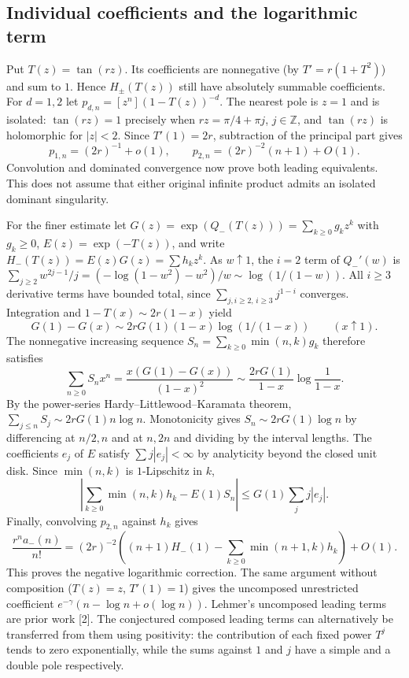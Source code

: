\documentclass[11pt,a4paper]{article}
\numberwithin{equation}{section}
\theoremstyle{definition}
\theoremstyle{remark}
\begin{document}
\subsection*{Individual coefficients and the logarithmic term}
Put $T(z)=\tan(rz)$. Its coefficients are nonnegative (by $T'=r(1+T^2)$) and sum to $1$. Hence $H_\pm(T(z))$ still have absolutely summable coefficients. For $d=1,2$ let $p_{d,n}=[z^n](1-T(z))^{-d}$. The nearest pole is $z=1$ and is isolated: $\tan(rz)=1$ precisely when $rz=\pi/4+\pi j$, $j\in\mathbb Z$, and $\tan(rz)$ is holomorphic for $|z|<2$. Since $T'(1)=2r$, subtraction of the principal part gives
\[
 p_{1,n}=(2r)^{-1}+o(1),\qquad
 p_{2,n}=(2r)^{-2}(n+1)+O(1).
\]
Convolution and dominated convergence now prove both leading equivalents. This does not assume that either original infinite product admits an isolated dominant singularity.

For the finer estimate let $G(z)=\exp(Q_-(T(z)))=\sum_{k\ge0}g_kz^k$ with $g_k\ge0$, $E(z)=\exp(-T(z))$, and write $H_-(T(z))=E(z)G(z)=\sum h_kz^k$. As $w\uparrow1$, the $i=2$ term of $Q_-'(w)$ is
$\sum_{j\ge2}w^{2j-1}/j=(-\log(1-w^2)-w^2)/w\sim\log(1/(1-w))$.
All $i\ge3$ derivative terms have bounded total, since $\sum_{j,i\ge2,\, i\ge3}j^{1-i}$ converges. Integration and $1-T(x)\sim2r(1-x)$ yield
\[
 G(1)-G(x)\sim 2rG(1)(1-x)\log(1/(1-x))
 \qquad(x\uparrow1).
\]
The nonnegative increasing sequence $S_n=\sum_{k\ge0}\min(n,k)g_k$ therefore satisfies
\[
 \sum_{n\ge0}S_nx^n=\frac{x(G(1)-G(x))}{(1-x)^2}
 \sim\frac{2rG(1)}{1-x}\log\frac1{1-x}.
\]
By the power-series Hardy--Littlewood--Karamata theorem, $\sum_{j\le n}S_j\sim2rG(1)n\log n$. Monotonicity gives $S_n\sim2rG(1)\log n$ by differencing at $n/2,n$ and at $n,2n$ and dividing by the interval lengths. The coefficients $e_j$ of $E$ satisfy $\sum j|e_j|<\infty$ by analyticity beyond the closed unit disk. Since $\min(n,k)$ is $1$-Lipschitz in $k$,
\[
 \left|\sum_{k\ge0}\min(n,k)h_k-E(1)S_n\right|
 \le G(1)\sum_j j|e_j|.
\]
Finally, convolving $p_{2,n}$ against $h_k$ gives
\[
 \frac{r^na_-(n)}{n!}
 =(2r)^{-2}\left((n+1)H_-(1)-\sum_{k\ge0}\min(n+1,k)h_k\right)+O(1).
\]
This proves the negative logarithmic correction. The same argument without composition ($T(z)=z$, $T'(1)=1$) gives the uncomposed unrestricted coefficient $e^{-\gamma}(n-\log n+o(\log n))$. Lehmer's uncomposed leading terms are prior work [2]. The conjectured composed leading terms can alternatively be transferred from them using positivity: the contribution of each fixed power $T^j$ tends to zero exponentially, while the sums against $1$ and $j$ have a simple and a double pole respectively.
\end{document}
